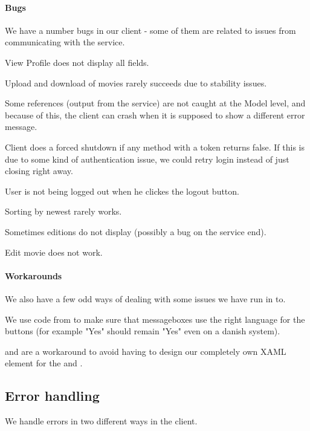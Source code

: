 \paragraph{Bugs} We have a number bugs in our client - some of them are related to issues from communicating with the service.
\begin{my_itemize}
\item View Profile does not display all fields.
\item Upload and download of movies rarely succeeds due to stability issues.
\item Some  references (output from the service) are not caught at the Model level, and because of this, the client can crash when it is supposed to show a different error message.
\item Client does a forced shutdown if any method with a token returns false. If this is due to some kind of authentication issue, we could retry login instead of just closing right away.
\item User is not being logged out when he clickes the logout button.
\item Sorting by newest rarely works.
\item Sometimes editions do not display (possibly a bug on the service end).
\item Edit movie does not work.
\end{my_itemize}

\paragraph{Workarounds} We also have a few odd ways of dealing with some issues we have run in to.
\begin{my_itemize}
\item We use code from \cite{CODE:MSGBOX} to make sure that messageboxes use the right language for the buttons (for example "Yes" should remain "Yes" even on a danish system).
\item {} and  are a workaround to avoid having to design our completely own XAML element for the  and .
\end{my_itemize}

\subsection{Error handling}
\label{Implementation_Client_Error}
We handle errors in two different ways in the client.
